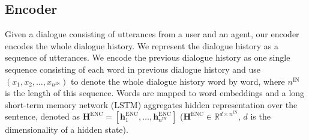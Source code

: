 \documentclass[11pt]{article}
\begin{document}
\subsection{Encoder}
Given a dialogue consisting of utterances from a user and an agent, our encoder encodes the whole dialogue history. We represent the dialogue history
as a sequence of utterances. We encode the previous dialogue history as one single sequence 
consisting of each word in previous dialogue history and use $\left (x_1, x_2,\ldots, x_{n^\text{IN}} \right)$ to denote the whole dialogue history word by word, where $n^\text{IN}$ is the length of this sequence. Words are 
mapped to word embeddings and a long short-term memory network (LSTM) aggregates hidden representation 
over the sentence, denoted as $ \boldsymbol H^\text{ENC}=\left [\boldsymbol h^\text{ENC}_1, \ldots,
\boldsymbol h^\text{ENC}_{n^\text{IN}}\right]$ ($\boldsymbol H^\text{ENC} \in \mathbb{R}^{d\times
	n^\text{IN}}$, $d$ is the dimensionality of a hidden state).
\end{document}
